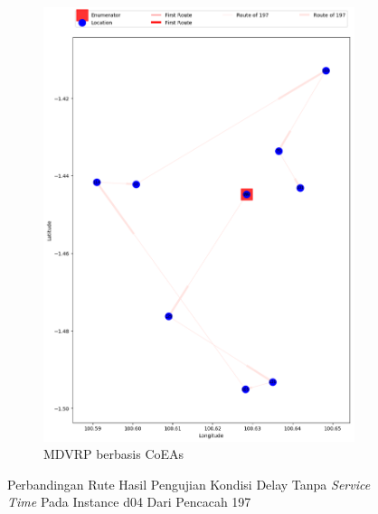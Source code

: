 \begin{figure}[H]
	\centering
	\begin{subfigure}[t]{\textwidth}
		\centering
		\includegraphics[width=\textwidth]{Resources/Images/delayed_4/real_m15_n100_delayed_4_197_coes}
		\caption{MDVRP berbasis CoEAs}
		\label{fig:real_m15_n100_delayed_4_197_coes}
	\end{subfigure}
	\caption{Perbandingan Rute Hasil Pengujian Kondisi Delay Tanpa \textit{Service Time} Pada Instance d04 Dari Pencacah 197}
	\label{fig:real_m15_n100_delayed_4_197}
\end{figure}


